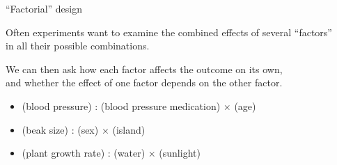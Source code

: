 \begin{frame}{``Factorial'' design}

    Often experiments want to examine the combined effects of several ``factors''\\
    in all their possible combinations. \\

    \vspace{2em}

    We can then ask how each factor affects the outcome on its own,\\
    and whether the effect of one factor depends on the other factor.

    \vspace{2em}


    \begin{itemize}
        \item (blood pressure) :  (blood pressure medication) $\times$ (age)
        \item (beak size) : (sex) $\times$ (island)
        \item (plant growth rate) : (water) $\times$ (sunlight)
    \end{itemize}


\end{frame}


